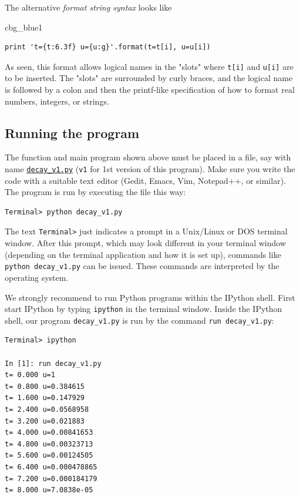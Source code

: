 \documentclass[%
oneside,                 %
final,                   %
10pt]{article}
\newenvironment{_cod_tight}[1]{
   \def\FrameCommand{\colorbox{#1}}
   \FrameRule0.6pt\MakeFramed {\FrameRestore}\vskip3mm}
   {\vskip0mm\endMakeFramed}
\newenvironment{cod}[1]{
\bgroup\rmfamily
\fboxsep=0mm\relax
\begin{_cod_tight}{#1}
\list{}{\parsep=-2mm\parskip=0mm\topsep=0pt\leftmargin=2mm
\rightmargin=2\leftmargin\leftmargin=4pt\relax}
\item\relax}
{\endlist\end{_cod_tight}\egroup}
\begin{document}

The alternative \emph{format string syntax} looks like
\begin{cod}{cbg_blue1}\begin{Verbatim}[numbers=none,fontsize=\fontsize{9pt}{9pt},baselinestretch=0.95,xleftmargin=2mm]
print 't={t:6.3f} u={u:g}'.format(t=t[i], u=u[i])
\end{Verbatim}
\end{cod}
\noindent
As seen, this format allows logical names in the "slots" where
\texttt{t[i]} and \texttt{u[i]} are to be inserted. The "slots" are surrounded
by curly braces, and the logical name is followed by a colon and
then the printf-like specification of how to format real numbers,
integers, or strings.

\subsection{Running the program}

The function and main program shown above must be placed in a file,
say with name \href{{http://tinyurl.com/ofkw6kc/alg/decay_v1.py}}{\nolinkurl{decay_v1.py}} (\texttt{v1} for 1st version of this program).  Make sure you
write the code with a suitable text editor (Gedit, Emacs, Vim,
Notepad++, or similar).  The program is run by executing the file this
way:

\begin{Verbatim}[frame=lines,label=\fbox{{\tiny Terminal}},framesep=2.5mm,framerule=0.7pt,fontsize=\fontsize{9pt}{9pt}]
Terminal> python decay_v1.py
\end{Verbatim}
The text \texttt{Terminal>} just indicates a prompt in a
Unix/Linux or DOS terminal window. After this prompt, which may look
different in your terminal window (depending on the terminal application
and how it is set up), commands like \Verb!python decay_v1.py! can be issued.
These commands are interpreted by the operating system.

We strongly recommend to run Python programs within the IPython shell.
First start IPython by typing \texttt{ipython} in the terminal window.
Inside the IPython shell, our program \Verb!decay_v1.py! is run by the command
\Verb!run decay_v1.py!:

\begin{Verbatim}[frame=lines,label=\fbox{{\tiny Terminal}},framesep=2.5mm,framerule=0.7pt,fontsize=\fontsize{9pt}{9pt}]
Terminal> ipython

In [1]: run decay_v1.py
t= 0.000 u=1
t= 0.800 u=0.384615
t= 1.600 u=0.147929
t= 2.400 u=0.0568958
t= 3.200 u=0.021883
t= 4.000 u=0.00841653
t= 4.800 u=0.00323713
t= 5.600 u=0.00124505
t= 6.400 u=0.000478865
t= 7.200 u=0.000184179
t= 8.000 u=7.0838e-05
\end{Verbatim}
\end{document}
